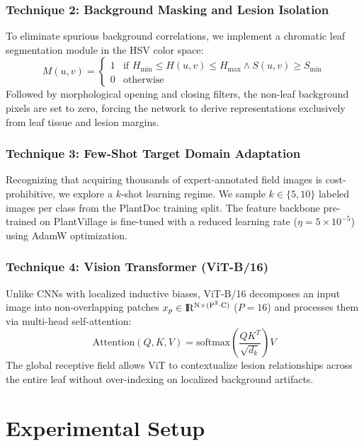 \documentclass[twoside,a4paper,11pt]{article}
\newcommand{\Runo}{\rm I\hspace{-0.55ex}R}
\begin{document}
\subsubsection{Technique 2: Background Masking and Lesion Isolation}
To eliminate spurious background correlations, we implement a chromatic leaf segmentation module in the HSV color space:
\begin{equation}
M(u, v) = \begin{cases} 
1 & \text{if } H_{\text{min}} \le H(u, v) \le H_{\text{max}} \land S(u, v) \ge S_{\text{min}} \\
0 & \text{otherwise}
\end{cases}
\end{equation}
Followed by morphological opening and closing filters, the non-leaf background pixels are set to zero, forcing the network to derive representations exclusively from leaf tissue and lesion margins.

\subsubsection{Technique 3: Few-Shot Target Domain Adaptation}
Recognizing that acquiring thousands of expert-annotated field images is cost-prohibitive, we explore a $k$-shot learning regime. We sample $k \in \{5, 10\}$ labeled images per class from the PlantDoc training split. The feature backbone pre-trained on PlantVillage is fine-tuned with a reduced learning rate ($\eta = 5 \times 10^{-5}$) using AdamW optimization.

\subsubsection{Technique 4: Vision Transformer (ViT-B/16)}
Unlike CNNs with localized inductive biases, ViT-B/16 decomposes an input image into non-overlapping patches $x_p \in \Runo^{N \times (P^2 \cdot C)}$ ($P=16$) and processes them via multi-head self-attention:
\begin{equation}
\text{Attention}(Q, K, V) = \text{softmax}\left(\frac{QK^T}{\sqrt{d_k}}\right)V
\end{equation}
The global receptive field allows ViT to contextualize lesion relationships across the entire leaf without over-indexing on localized background artifacts.

\section{Experimental Setup}
\end{document}
